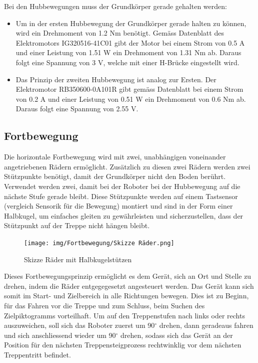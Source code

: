 Bei den Hubbewegungen muss der Grundkörper gerade gehalten werden:
\begin{itemize}
    \item Um in der ersten Hubbewegung der Grundkörper gerade halten zu können, wird ein Drehmoment von 1.2 Nm benötigt. Gemäss Datenblatt des Elektromotors IG320516-41C01 gibt der Motor bei einem Strom von 0.5 A und einer Leistung von 1.51 W ein Drehmoment von 1.31 Nm ab. Daraus folgt eine Spannung von 3 V, welche mit einer H-Brücke eingestellt wird.
    \item Das Prinzip der zweiten Hubbewegung ist analog zur Ersten. Der Elektromotor RB350600-0A101R gibt gemäss Datenblatt bei einem Strom von 0.2 A und einer Leistung von 0.51 W ein Drehmoment von 0.6 Nm ab. Daraus folgt eine Spannung von 2.55 V.
 \end{itemize}


\newpage
\subsection{Fortbewegung}
Die horizontale Fortbewegung wird mit zwei, unabhängigen voneinander angetriebenen Rädern ermöglicht. Zusätzlich zu diesen zwei Rädern werden zwei Stützpunkte benötigt, damit der Grundkörper nicht den Boden berührt. Verwendet werden zwei, damit bei der Roboter bei der Hubbewegung auf die nächste Stufe gerade bleibt. Diese Stützpunkte werden auf einem Tastsensor (vergleich Sensorik für die Bewegung) montiert und sind in der Form einer Halbkugel, um einfaches gleiten zu gewährleisten und sicherzustellen, dass der Stützpunkt auf der Treppe nicht hängen bleibt.

\begin{figure}[H]
  \texttt{[image: img/Fortbewegung/Skizze Räder.png]}
  \centering
  \caption{Skizze Räder mit Halbkugelstützen}
\end{figure}

Dieses Fortbewegungsprinzip ermöglicht es dem Gerät, sich an Ort und Stelle zu drehen, indem die Räder entgegegesetzt angesteuert werden. Das Gerät kann sich somit im Start- und Zielbereich in alle Richtungen bewegen. Dies ist zu Beginn, für das Fahren vor die Treppe und zum Schluss, beim Suchen des Zielpiktogramms vorteilhaft. Um auf den Treppenstufen nach links oder rechts auszuweichen, soll sich das Roboter zuerst um 90$^\circ$ drehen, dann geradeaus fahren und sich anschliessend wieder um 90$^\circ$ drehen, sodass sich das Gerät an der Position für den nächsten Treppensteigprozess rechtwinklig vor dem nächsten Treppentritt befindet.


